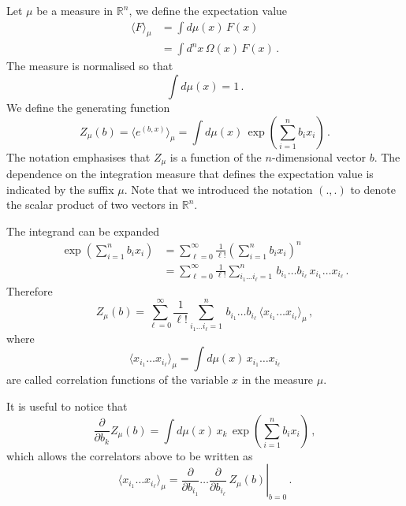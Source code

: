 Let $\mu$ be a measure in $\mathbb{R}^n$, we define the expectation value 
\begin{align}
  \label{eq:ExpValMu}
  \langle F \rangle_\mu &= \int d\mu(x)\, F(x) \\
  &= \int d^nx\, \Omega(x)\, F(x)\, .
\end{align}
The measure is normalised so that
\begin{equation}
  \label{eq:MeasureNorm}
  \int d\mu(x) = 1\, .
\end{equation}
We define the generating function
\begin{equation}
  \label{eq:ZGenFunc}
  Z_\mu(b) = \langle e^{(b,x)}\rangle_\mu = 
  \int d\mu(x)\, \exp\left(
    \sum_{i=1}^n b_i x_i
  \right)\, .
\end{equation}
The notation emphasises that $Z_\mu$ is a function of the $n$-dimensional vector $b$. The dependence on the integration measure that defines the expectation value is indicated by the suffix $\mu$. Note that we introduced the notation $(.,.)$ to denote the scalar product of two vectors in $\mathbb{R}^n$.

The integrand can be expanded
\begin{align}
  \exp\left(
    \sum_{i=1}^n b_i x_i
  \right) &= 
            \sum_{\ell=0}^\infty \frac{1}{\ell!} \left(
    \sum_{i=1}^n b_i x_i
  \right)^n \\
  &= \sum_{\ell=0}^\infty \frac{1}{\ell!}
    \sum_{i_1 \ldots i_\ell=1}^n \, b_{i_1} \ldots b_{i_\ell}\,
    x_{i_1} \ldots x_{i_\ell}\, .
\end{align}
Therefore
\begin{equation}
  \label{eq:ZExp}
  Z_\mu(b) =  \sum_{\ell=0}^\infty \frac{1}{\ell!}
    \sum_{i_1 \ldots i_\ell=1}^n \, b_{i_1} \ldots b_{i_\ell}\,
    \langle x_{i_1} \ldots x_{i_\ell}\rangle_\mu\, ,
\end{equation}
where
\begin{equation}
  \label{eq:XCorrel}
   \langle x_{i_1} \ldots x_{i_\ell}\rangle_\mu = 
   \int d\mu(x)\, x_{i_1} \ldots x_{i_\ell}
\end{equation}
are called correlation functions of the variable $x$ in the measure $\mu$.

It is useful to notice that 
\begin{equation}
  \label{eq:DiffGenFunct}
  \frac{\partial}{\partial b_k} Z_\mu(b) = \int d\mu(x)\, x_k\, \exp\left(
    \sum_{i=1}^n b_i x_i
  \right)\, ,
\end{equation}
which allows the correlators above to be written as
\begin{equation}
  \label{eq:DiffGenFunctCorr}
  \langle x_{i_1} \ldots x_{i_\ell}\rangle_\mu = \left.
  \frac{\partial}{\partial b_{i_1}} \ldots \frac{\partial}{\partial b_{i_\ell}}\,
  Z_\mu(b) \right|_{b=0}\, .
\end{equation}

